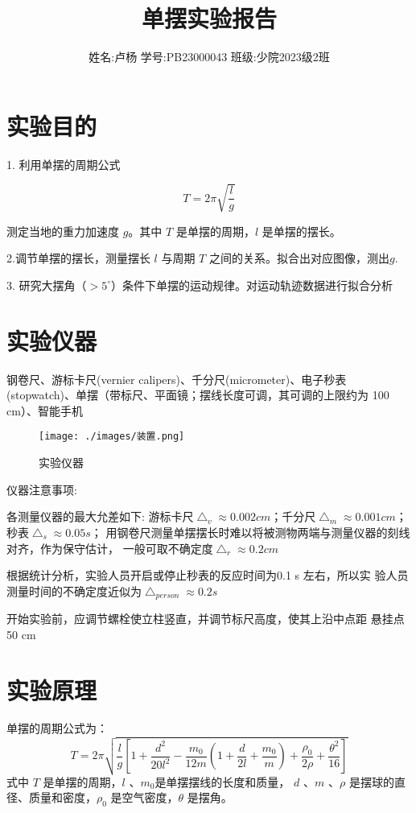 \documentclass{article}
\title{单摆实验报告}
\author{姓名:卢杨 \quad 学号:PB23000043 \quad 班级:少院2023级2班}
\begin{document}
\maketitle
\section{实验目的}
    1. 利用单摆的周期公式
    
    \[ T=2\pi\sqrt{\frac{l}{g}}\]
    
    测定当地的重力加速度 $g$。其中 $T$ 是单摆的周期，$l$ 是单摆的摆长。

    2.调节单摆的摆长，测量摆长 $l$ 与周期 $T$ 之间的关系。拟合出对应图像，测出$g$.

    3. 研究大摆角（$>5^{\circ }$）条件下单摆的运动规律。对运动轨迹数据进行拟合分析
\section{实验仪器}
    钢卷尺、游标卡尺(vernier calipers)、千分尺(micrometer)、电子秒表(stopwatch)、单摆（带标尺、平面镜；摆线长度可调，其可调的上限约为 100 cm）、智能手机
        
    \begin{figure}[!hbtp]
        \centering
        \texttt{[image: ./images/装置.png]}
        \caption{实验仪器}
    \end{figure} 

    仪器注意事项:

    各测量仪器的最大允差如下:
    游标卡尺$\bigtriangleup_{v}\approx 0.002 cm$；千分尺$\bigtriangleup_{m}\approx 0.001 cm$；秒表$\bigtriangleup_{s}\approx 0.05 s$；
    用钢卷尺测量单摆摆长时难以将被测物两端与测量仪器的刻线对齐，作为保守估计，
    一般可取不确定度$\bigtriangleup_{r}\approx 0.2 cm$

    根据统计分析，实验人员开启或停止秒表的反应时间为0.1 s 左右，所以实
    验人员测量时间的不确定度近似为$\bigtriangleup_{person}\approx 0.2s$

    开始实验前，应调节螺栓使立柱竖直，并调节标尺高度，使其上沿中点距
    悬挂点 50 cm
\section{实验原理}
    
    单摆的周期公式为：
    \[ T=2\pi \sqrt{\frac{l}{g}[1+\frac{d^{2}}{20l^{2}}-\frac{m_{0}}{12m}(1+\frac{d}{2l}+\frac{m_{0}}{m})+\frac{\rho _{0}}{2\rho }+\frac{\theta ^{2}}{16}]} \]
    式中 $T$ 是单摆的周期，$l$ 、$m_{0}$是单摆摆线的长度和质量， $d$ 、$m$ 、$\rho $ 是摆球的直
    径、质量和密度，$\rho  _{0}$ 是空气密度，$\theta $ 是摆角。
    
\end{document}
